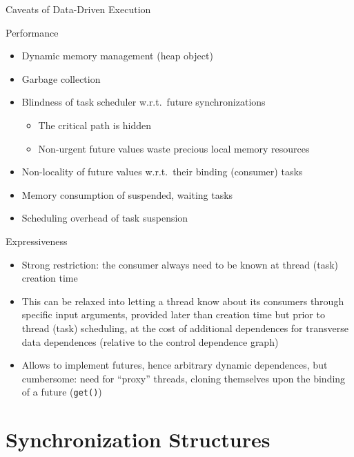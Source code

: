 \documentclass[xcolor=dvipsnames,9pt,mathserif]{beamer}
\begin{document}
\begin{frame}{Caveats of Data-Driven Execution}
  \begin{block}{Performance}
    \begin{itemize}
    \item \color{gray}Dynamic memory management (heap object)
    \item \color{gray}Garbage collection
    \item \color{gray}Blindness of task scheduler w.r.t.\ future
      synchronizations
      \begin{itemize}
      \item \color{gray}The critical path is hidden
      \item \color{gray}Non-urgent future values waste precious local
        memory resources
      \end{itemize}
    \item \color{gray}Non-locality of future values w.r.t.\ their
      binding (consumer) tasks
    \item \color{gray}Memory consumption of suspended, waiting tasks
    \item \color{gray}Scheduling overhead of task suspension
    \end{itemize}
  \end{block}
  
  \begin{block}{Expressiveness}
    \begin{itemize}
    \item Strong restriction: the consumer always need to be known at
      thread (task) creation time
    \item This can be relaxed into letting a thread know about its
      consumers through specific input arguments, provided later than
      creation time but prior to thread (task) scheduling, at the cost
      of additional dependences for transverse data dependences
      (relative to the control dependence graph)
    \item Allows to implement futures, hence arbitrary dynamic
      dependences, but cumbersome: need for ``proxy'' threads, cloning
      themselves upon the binding of a future (\texttt{get()})
    \end{itemize}
  \end{block}
\end{frame}

\section{Synchronization  Structures}
\end{document}
